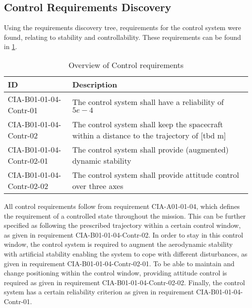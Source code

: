 \subsection{Control Requirements Discovery} \label{sec:req-control}
Using the requirements discovery tree, requirements for the control system were found, relating to stability and controllability. These requirements can be found in \ref{tab:controlreq}.

\begin{table}[H]
	\caption{Overview of Control requirements}
	\begin{tabular}{|p{}|p{}|}
		\hline
		ID         					&	Description																							\\ \hline \hline
		CIA-B01-01-04-Contr-01		&	The control system shall have a reliability of $5e-4$            									\\ \hline
		CIA-B01-01-04-Contr-02 		&	The control system shall keep the spacecraft within a distance to the trajectory of [\gls{tbd} m]	\\ \hline	
		CIA-B01-01-04-Contr-02-01 	&	The control system shall provide (augmented) dynamic stability       								\\ \hline
		CIA-B01-01-04-Contr-02-02 	&	The control system shall provide attitude control over three axes         							\\ \hline	
	\end{tabular}
	\label{tab:controlreq}
\end{table}

All control requirements follow from requirement CIA-A01-01-04, which defines the requirement of a controlled state throughout the mission. 
This can be further specified as following the prescribed trajectory within a certain control window, as given in requirement CIA-B01-01-04-Contr-02. 
In order to stay in this control window, the control system is required to augment the aerodynamic stability with artificial stability enabling the system to cope with different disturbances, as given in requirement CIA-B01-01-04-Contr-02-01. 
To be able to maintain and change positioning within the control window, providing attitude control is required as given in requirement CIA-B01-01-04-Contr-02-02. 
Finally, the control system has a certain reliability criterion as given in requirement CIA-B01-01-04-Contr-01.